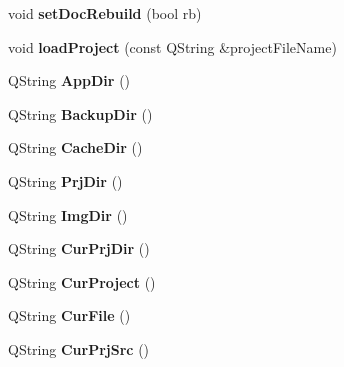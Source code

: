 \begin{DoxyCompactItemize}
\item 
\hypertarget{classConfig_ad0c5f895ea515bf64d88697c59fc91ad}{
void {\bfseries setDocRebuild} (bool rb)}
\label{classConfig_ad0c5f895ea515bf64d88697c59fc91ad}

\item 
\hypertarget{classConfig_aef1300c347a555abbc5971d03b558c6b}{
void {\bfseries loadProject} (const QString \&projectFileName)}
\label{classConfig_aef1300c347a555abbc5971d03b558c6b}

\item 
\hypertarget{classConfig_a43989a61b97bf8a825892ffe01d6586f}{
QString {\bfseries AppDir} ()}
\label{classConfig_a43989a61b97bf8a825892ffe01d6586f}

\item 
\hypertarget{classConfig_a5873a0c82f9dd33ae3dc108a6db351c0}{
QString {\bfseries BackupDir} ()}
\label{classConfig_a5873a0c82f9dd33ae3dc108a6db351c0}

\item 
\hypertarget{classConfig_a5f20554f016e6f2952376cc373ae3345}{
QString {\bfseries CacheDir} ()}
\label{classConfig_a5f20554f016e6f2952376cc373ae3345}

\item 
\hypertarget{classConfig_a671ebf708cbc7b01ce0a61a0b6ff827e}{
QString {\bfseries PrjDir} ()}
\label{classConfig_a671ebf708cbc7b01ce0a61a0b6ff827e}

\item 
\hypertarget{classConfig_aa70f6cced73d5dda4f2a3e4603992608}{
QString {\bfseries ImgDir} ()}
\label{classConfig_aa70f6cced73d5dda4f2a3e4603992608}

\item 
\hypertarget{classConfig_ade4aa796455fbdabd927bce06e58b8fb}{
QString {\bfseries CurPrjDir} ()}
\label{classConfig_ade4aa796455fbdabd927bce06e58b8fb}

\item 
\hypertarget{classConfig_a27ab8b999c3d0fd2199581b21089f93f}{
QString {\bfseries CurProject} ()}
\label{classConfig_a27ab8b999c3d0fd2199581b21089f93f}

\item 
\hypertarget{classConfig_a5763c8f37e98213b9780a854ea6f78a7}{
QString {\bfseries CurFile} ()}
\label{classConfig_a5763c8f37e98213b9780a854ea6f78a7}

\item 
\hypertarget{classConfig_a51c8e3808dc5f537be4c673adbcf8abc}{
QString {\bfseries CurPrjSrc} ()}
\label{classConfig_a51c8e3808dc5f537be4c673adbcf8abc}


\end{DoxyCompactItemize}
